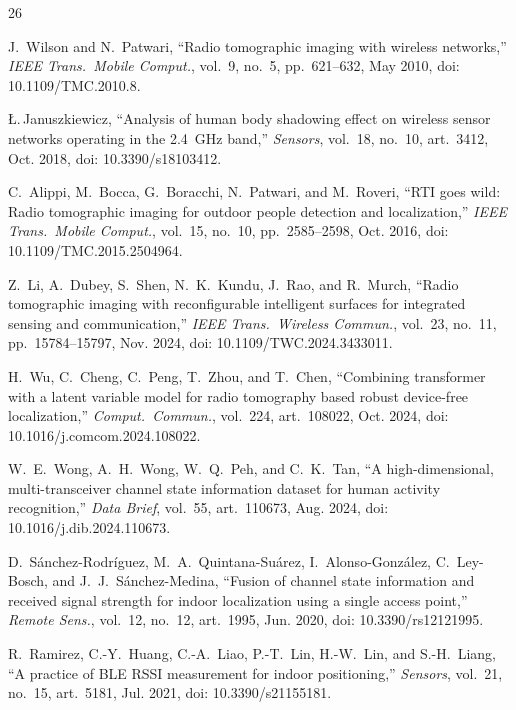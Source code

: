 \documentclass[journal,10pt]{IEEEtran}
\begin{document}
\balance
\begin{thebibliography}{26}

 J.~Wilson and N.~Patwari, ``Radio tomographic imaging with
wireless networks,'' \emph{IEEE Trans.\ Mobile Comput.}, vol.~9, no.~5,
pp.~621--632, May 2010, doi: 10.1109/TMC.2010.8.

 {\L}.\,Januszkiewicz, ``Analysis of human body
shadowing effect on wireless sensor networks operating in the 2.4~GHz band,''
\emph{Sensors}, vol.~18, no.~10, art.~3412, Oct. 2018, doi:
10.3390/s18103412.

 C.~Alippi, M.~Bocca, G.~Boracchi, N.~Patwari, and
M.~Roveri, ``RTI goes wild: Radio tomographic imaging for outdoor people
detection and localization,'' \emph{IEEE Trans.\ Mobile Comput.}, vol.~15,
no.~10, pp.~2585--2598, Oct. 2016, doi: 10.1109/TMC.2015.2504964.

 Z.~Li, A.~Dubey, S.~Shen, N.~K.~Kundu, J.~Rao, and R.~Murch,
``Radio tomographic imaging with reconfigurable intelligent surfaces for
integrated sensing and communication,'' \emph{IEEE Trans.\ Wireless Commun.},
vol.~23, no.~11, pp.~15784--15797, Nov. 2024, doi: 10.1109/TWC.2024.3433011.

 H.~Wu, C.~Cheng, C.~Peng, T.~Zhou, and T.~Chen, ``Combining
transformer with a latent variable model for radio tomography based robust
device-free localization,'' \emph{Comput.\ Commun.}, vol.~224, art.~108022,
Oct. 2024, doi: 10.1016/j.comcom.2024.108022.

 W.~E.~Wong, A.~H.~Wong, W.~Q.~Peh, and C.~K.~Tan, ``A
high-dimensional, multi-transceiver channel state information dataset for
human activity recognition,'' \emph{Data Brief}, vol.~55,
art.~110673, Aug. 2024, doi: 10.1016/j.dib.2024.110673.

 D.~S\'anchez-Rodr\'iguez, M.~A.~Quintana-Su\'arez,
I.~Alonso-Gonz\'alez, C.~Ley-Bosch, and J.~J.~S\'anchez-Medina, ``Fusion of
channel state information and received signal strength for indoor localization
using a single access point,'' \emph{Remote Sens.}, vol.~12, no.~12,
art.~1995, Jun. 2020, doi: 10.3390/rs12121995.

 R.~Ramirez, C.-Y.~Huang, C.-A.~Liao, P.-T.~Lin, H.-W.~Lin,
and S.-H.~Liang, ``A practice of BLE RSSI measurement for indoor positioning,''
\emph{Sensors}, vol.~21, no.~15, art.~5181, Jul. 2021, doi: 10.3390/s21155181.


\end{thebibliography}
\end{document}
